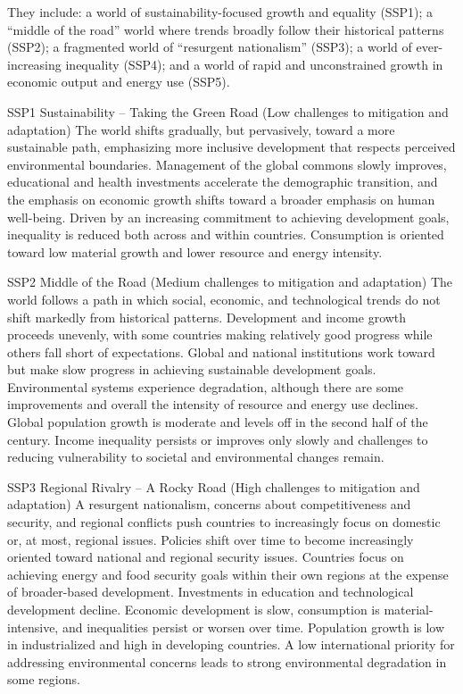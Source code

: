 \documentclass[
]{book}
\begin{document}
They include: a world of sustainability-focused growth and equality (SSP1); a ``middle of the road'' world where trends broadly follow their historical patterns (SSP2); a fragmented world of ``resurgent nationalism'' (SSP3); a world of ever-increasing inequality (SSP4); and a world of rapid and unconstrained growth in economic output and energy use (SSP5).

SSP1 Sustainability -- Taking the Green Road (Low challenges to mitigation and adaptation)
The world shifts gradually, but pervasively, toward a more sustainable path, emphasizing more inclusive development that respects perceived environmental boundaries. Management of the global commons slowly improves, educational and health investments accelerate the demographic transition, and the emphasis on economic growth shifts toward a broader emphasis on human well-being. Driven by an increasing commitment to achieving development goals, inequality is reduced both across and within countries. Consumption is oriented toward low material growth and lower resource and energy intensity.

SSP2 Middle of the Road (Medium challenges to mitigation and adaptation)
The world follows a path in which social, economic, and technological trends do not shift markedly from historical patterns. Development and income growth proceeds unevenly, with some countries making relatively good progress while others fall short of expectations. Global and national institutions work toward but make slow progress in achieving sustainable development goals. Environmental systems experience degradation, although there are some improvements and overall the intensity of resource and energy use declines. Global population growth is moderate and levels off in the second half of the century. Income inequality persists or improves only slowly and challenges to reducing vulnerability to societal and environmental changes remain.

SSP3 Regional Rivalry -- A Rocky Road (High challenges to mitigation and adaptation)
A resurgent nationalism, concerns about competitiveness and security, and regional conflicts push countries to increasingly focus on domestic or, at most, regional issues. Policies shift over time to become increasingly oriented toward national and regional security issues. Countries focus on achieving energy and food security goals within their own regions at the expense of broader-based development. Investments in education and technological development decline. Economic development is slow, consumption is material-intensive, and inequalities persist or worsen over time. Population growth is low in industrialized and high in developing countries. A low international priority for addressing environmental concerns leads to strong environmental degradation in some regions.
\end{document}
